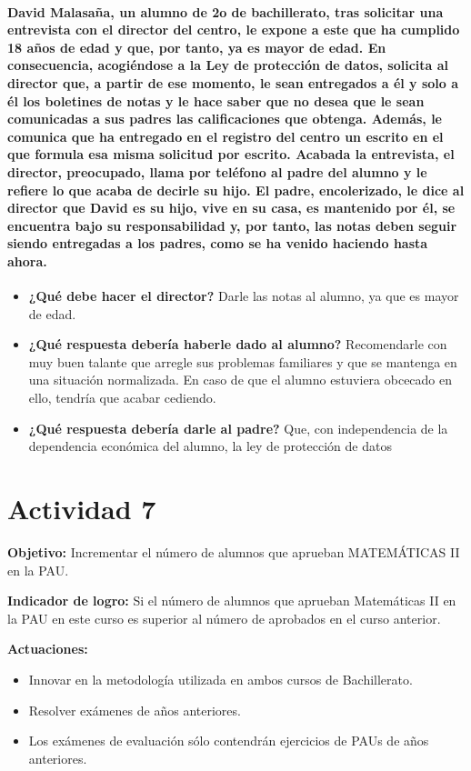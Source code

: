 \paragraph{David Malasaña, un alumno de 2o de bachillerato, tras solicitar una entrevista con el
director del centro, le expone a este que ha cumplido 18 años de edad y que, por
tanto, ya es mayor de edad. En consecuencia, acogiéndose a la Ley de protección de
datos, solicita al director que, a partir de ese momento, le sean entregados a él y solo
a él los boletines de notas y le hace saber que no desea que le sean comunicadas a sus
padres las calificaciones que obtenga. Además, le comunica que ha entregado en el
registro del centro un escrito en el que formula esa misma solicitud por escrito.
Acabada la entrevista, el director, preocupado, llama por teléfono al padre del alumno
y le refiere lo que acaba de decirle su hijo. El padre, encolerizado, le dice al director
que David es su hijo, vive en su casa, es mantenido por él, se encuentra bajo su
responsabilidad y, por tanto, las notas deben seguir siendo entregadas a los padres,
como se ha venido haciendo hasta ahora.}

\begin{itemize}
\item \textbf{¿Qué debe hacer el director?}
\subitem Darle las notas al alumno, ya que es mayor de edad.
\item \textbf{¿Qué respuesta debería haberle dado al alumno?}
\subitem Recomendarle con muy buen talante que arregle sus problemas familiares y que se mantenga en una situación normalizada.
%
En caso de que el alumno estuviera obcecado en ello, tendría que acabar cediendo.
\item \textbf{¿Qué respuesta debería darle al padre?}
\subitem Que, con independencia de la dependencia económica del alumno, la ley de protección de datos
\end{itemize}


\section{Actividad 7}

\textbf{Objetivo:}
Incrementar el número de alumnos que aprueban MATEMÁTICAS II en la PAU.

\textbf{Indicador de logro:}
Si el número de alumnos que aprueban Matemáticas II en la PAU en este curso es superior al número de aprobados en el curso anterior.

\textbf{Actuaciones:}
\vspace{-0.3cm}
\begin{itemize}
	\item Innovar en la metodología utilizada en ambos cursos de Bachillerato.
	\item Resolver exámenes de años anteriores.
	\item Los exámenes de evaluación sólo contendrán ejercicios de PAUs de años anteriores.
\end{itemize}

